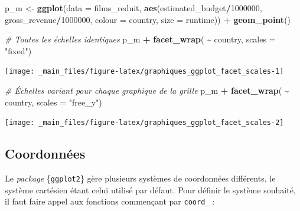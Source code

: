 \documentclass[
  11pt,
]{book}
\newenvironment{Shaded}{\begin{snugshade}}{\end{snugshade}}
\newcommand{\CommentTok}[1]{\textcolor[rgb]{0.56,0.35,0.01}{\textit{#1}}}
\newcommand{\DataTypeTok}[1]{\textcolor[rgb]{0.13,0.29,0.53}{#1}}
\newcommand{\DecValTok}[1]{\textcolor[rgb]{0.00,0.00,0.81}{#1}}
\newcommand{\KeywordTok}[1]{\textcolor[rgb]{0.13,0.29,0.53}{\textbf{#1}}}
\newcommand{\NormalTok}[1]{#1}
\newcommand{\OperatorTok}[1]{\textcolor[rgb]{0.81,0.36,0.00}{\textbf{#1}}}
\newcommand{\StringTok}[1]{\textcolor[rgb]{0.31,0.60,0.02}{#1}}
\numberwithin{equation}{section}
\numberwithin{countremarque}{section}
\begin{document}
\begin{Shaded}
\begin{Highlighting}[]
\NormalTok{p\_m \textless{}{-}}\StringTok{ }\KeywordTok{ggplot}\NormalTok{(}\DataTypeTok{data =}\NormalTok{ films\_reduit,}
       \KeywordTok{aes}\NormalTok{(estimated\_budget}\OperatorTok{/}\DecValTok{1000000}\NormalTok{, }
\NormalTok{           gross\_revenue}\OperatorTok{/}\DecValTok{1000000}\NormalTok{, }
           \DataTypeTok{colour =}\NormalTok{ country, }
           \DataTypeTok{size =}\NormalTok{ runtime)) }\OperatorTok{+}
\StringTok{  }\KeywordTok{geom\_point}\NormalTok{()}

\CommentTok{\# Toutes les échelles identiques}
\NormalTok{p\_m }\OperatorTok{+}\StringTok{ }\KeywordTok{facet\_wrap}\NormalTok{( }\OperatorTok{\textasciitilde{}}\StringTok{ }\NormalTok{country, }\DataTypeTok{scales =} \StringTok{"fixed"}\NormalTok{)}
\end{Highlighting}
\end{Shaded}

\begin{center}\texttt{[image: \_main\_files/figure-latex/graphiques\_ggplot\_facet\_scales-1]} \end{center}

\begin{Shaded}
\begin{Highlighting}[]
\CommentTok{\# Échelles variant pour chaque graphique de la grille}
\NormalTok{p\_m }\OperatorTok{+}\StringTok{ }\KeywordTok{facet\_wrap}\NormalTok{( }\OperatorTok{\textasciitilde{}}\StringTok{ }\NormalTok{country, }\DataTypeTok{scales =} \StringTok{"free\_y"}\NormalTok{)}
\end{Highlighting}
\end{Shaded}

\begin{center}\texttt{[image: \_main\_files/figure-latex/graphiques\_ggplot\_facet\_scales-2]} \end{center}

\hypertarget{graphiques_ggplot_coord}{%
\subsection{Coordonnées}\label{graphiques_ggplot_coord}}

Le \emph{package} \{\texttt{ggplot2}\} gère plusieurs systèmes de coordonnées différents, le système cartésien étant celui utilisé par défaut. Pour définir le système souhaité, il faut faire appel aux fonctions commençant par \texttt{coord\_} :
\end{document}
